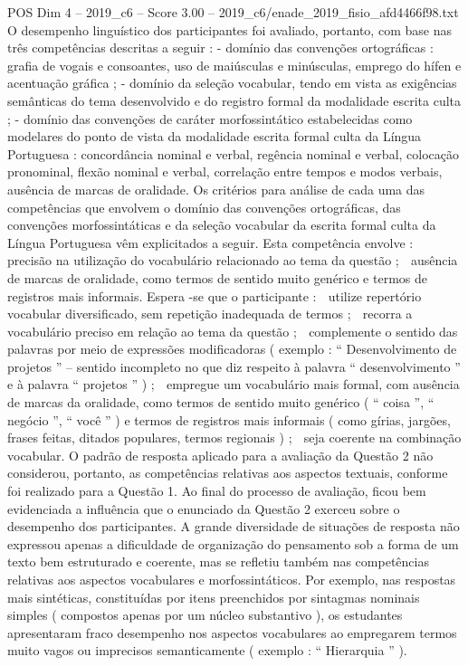 \begin{textsample}{POS Dim 4 – 2019\_c6 – Score 3.00 – 2019\_c6/enade\_2019\_fisio\_afd4466f98.txt}
O desempenho linguístico dos participantes foi avaliado, portanto, com base nas três competências descritas a seguir : - domínio das convenções ortográficas : grafia de vogais e consoantes, uso de maiúsculas e minúsculas, emprego do hífen e acentuação gráfica ; - domínio da seleção vocabular, tendo em vista as exigências semânticas do tema desenvolvido e do registro formal da modalidade escrita culta ; - domínio das convenções de caráter morfossintático estabelecidas como modelares do ponto de vista da modalidade escrita formal culta da Língua Portuguesa : concordância nominal e verbal, regência nominal e verbal, colocação pronominal, flexão nominal e verbal, correlação entre tempos e modos verbais, ausência de marcas de oralidade.
Os critérios para análise de cada uma das competências que envolvem o domínio das convenções ortográficas, das convenções morfossintáticas e da seleção vocabular da escrita formal culta da Língua Portuguesa vêm explicitados a seguir.
Esta competência envolve :  precisão na utilização do vocabulário relacionado ao tema da questão ;  ausência de marcas de oralidade, como termos de sentido muito genérico e termos de registros mais informais.
Espera -se que o participante :  utilize repertório vocabular diversificado, sem repetição inadequada de termos ;  recorra a vocabulário preciso em relação ao tema da questão ;  complemente o sentido das palavras por meio de expressões modificadoras ( exemplo : “ Desenvolvimento de projetos ” – sentido incompleto no que diz respeito à palavra “ desenvolvimento ” e à palavra “ projetos ” ) ;  empregue um vocabulário mais formal, com ausência de marcas da oralidade, como termos de sentido muito genérico ( “ coisa ”, “ negócio ”, “ você ” ) e termos de registros mais informais ( como gírias, jargões, frases feitas, ditados populares, termos regionais ) ;  seja coerente na combinação vocabular.
O padrão de resposta aplicado para a avaliação da Questão 2 não considerou, portanto, as competências relativas aos aspectos textuais, conforme foi realizado para a Questão 1.
Ao final do processo de avaliação, ficou bem evidenciada a influência que o enunciado da Questão 2 exerceu sobre o desempenho dos participantes.
A grande diversidade de situações de resposta não expressou apenas a dificuldade de organização do pensamento sob a forma de um texto bem estruturado e coerente, mas se refletiu também nas competências relativas aos aspectos vocabulares e morfossintáticos.
Por exemplo, nas respostas mais sintéticas, constituídas por itens preenchidos por sintagmas nominais simples ( compostos apenas por um núcleo substantivo ), os estudantes apresentaram fraco desempenho nos aspectos vocabulares ao empregarem termos muito vagos ou imprecisos semanticamente ( exemplo : “ Hierarquia ” ).

\end{textsample}
